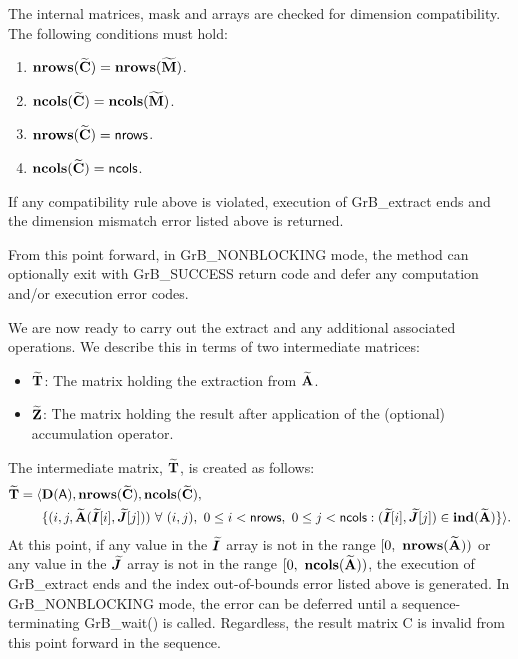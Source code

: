 The internal matrices, mask and arrays are checked for dimension compatibility. 
The following conditions must hold:
\begin{enumerate}
	\item $\bold{nrows}({\bf \widetilde{C}}) = \bold{nrows}({\bf \widetilde{M}})$.

	\item $\bold{ncols}({\bf \widetilde{C}}) = \bold{ncols}({\bf \widetilde{M}})$.

	\item $\bold{nrows}({\bf \widetilde{C}}) = {\sf nrows}$.

	\item $\bold{ncols}({\bf \widetilde{C}}) = {\sf ncols}$.
\end{enumerate}
If any compatibility rule above is violated, execution of {\sf GrB\_extract} ends 
and the dimension mismatch error listed above is returned.

From this point forward, in {\sf GrB\_NONBLOCKING} mode, the method can 
optionally exit with {\sf GrB\_SUCCESS} return code and defer any computation 
and/or execution error codes.

We are now ready to carry out the extract and any additional 
associated operations.  We describe this in terms of two intermediate matrices:
\begin{itemize}
    \item ${\bf \widetilde{T}}$: The matrix holding the extraction from 
    ${\bf \widetilde{A}}$.
    
    \item ${\bf \widetilde{Z}}$: The matrix holding the result after 
    application of the (optional) accumulation operator.
\end{itemize}

The intermediate matrix, ${\bf \widetilde{T}}$, is created as follows:
\[
\begin{aligned}
\matrix{\widetilde{T}} = \langle & \bold{D}({\sf A}),
                           \bold{nrows}(\matrix{\widetilde{C}}), 
                           \bold{ncols}(\matrix{\widetilde{C}}),  \\
                         & %
\{(i,j,\matrix{\widetilde{A}}(\array{\widetilde{I}}[i],\array{\widetilde{J}}[j])) 
\ \forall \ (i,j), \ 0 \leq i < {\sf nrows}, \ 0 \leq j < {\sf ncols} :
(\array{\widetilde{I}}[i], \array{\widetilde{J}}[j]) \in 
\bold{ind}(\matrix{\widetilde{A}}) \} \rangle.
\end{aligned}
\]
At this point, if any value in the $\bm{\widetilde{I}}$ array is not in
the range $[0,\ \bold{nrows}({\bf \widetilde{A}}) )$ or any value in the 
$\bm{\widetilde{J}}$ array is not in the range 
$[0,\ \bold{ncols}({\bf \widetilde{A}}))$, the execution of {\sf GrB\_extract} 
ends and the index out-of-bounds error listed above is generated.  In 
{\sf GrB\_NONBLOCKING} mode, the error can be deferred until a 
sequence-terminating {\sf GrB\_wait()} is called.  Regardless, the result 
matrix {\sf C} is invalid from this point forward in the sequence.

